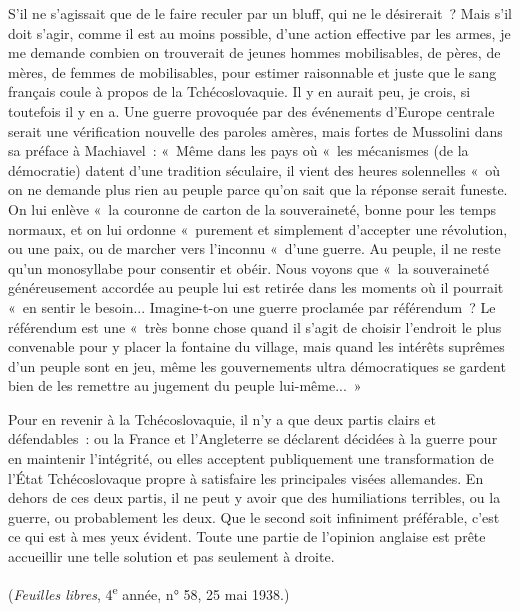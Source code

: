 \documentclass[french,twoside]{book} %
\begin{document}
S'il ne s'agissait que de le faire reculer par un bluff, qui ne le désirerait ? Mais s'il doit s'agir, comme il est au moins possible, d'une action effective par les armes, je me demande combien on trouverait de jeunes hommes mobilisa­bles, de pères, de mères, de femmes de mobilisables, pour estimer raisonnable et juste que le sang français coule à propos de la Tchécoslovaquie. Il y en aurait peu, je crois, si toutefois il y en a. Une guerre provoquée par des événements d'Europe centrale serait une vérification nouvelle des paroles amères, mais fortes de Mussolini dans sa préface à Machiavel : « Même dans les pays où « les mécanismes (de la démocratie) datent d'une tradition séculaire, il vient des heures solennelles « où on ne demande plus rien au peuple parce qu'on sait que la réponse serait funeste. On lui enlève « la couronne de carton de la souveraineté, bonne pour les temps normaux, et on lui ordonne « purement et simplement d'accepter une révolution, ou une paix, ou de marcher vers l'inconnu « d'une guerre. Au peuple, il ne reste qu'un monosyllabe pour consentir et obéir. Nous voyons que « la souveraineté généreusement accordée au peuple lui est retirée dans les moments où il pourrait « en sentir le besoin... Imagine-t-on une guerre proclamée par réfé­rendum ? Le référendum est une « très bonne chose quand il s'agit de choisir l'endroit le plus convenable pour y placer la fontaine du village, mais quand les intérêts suprêmes d'un peuple sont en jeu, même les gouvernements ultra démocratiques se gardent bien de les remettre au jugement du peuple lui-même... »\par
Pour en revenir à la Tchécoslovaquie, il n'y a que deux partis clairs et défendables : ou la France et l'Angleterre se déclarent décidées à la guerre pour en maintenir l'intégrité, ou elles acceptent publiquement une transforma­tion de l'État Tchécoslovaque propre à satisfaire les principales visées allemandes. En dehors de ces deux partis, il ne peut y avoir que des humilia­tions terribles, ou la guerre, ou probablement les deux. Que le second soit infiniment préférable, c'est ce qui est à mes yeux évident. Toute une partie de l'opinion anglaise est prête accueillir une telle solution et pas seulement à droite.\par
({\itshape Feuilles libres}, 4\textsuperscript{e} année, n° 58, 25 mai 1938.)\par

\begin{center}
\noindent \centerline{}
\end{center}
\end{document}
